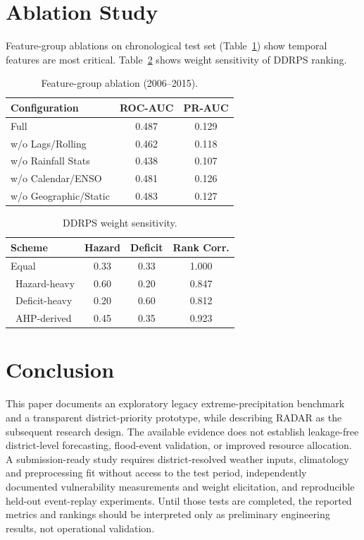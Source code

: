 \documentclass[conference]{IEEEtran}
\begin{document}
\section{Ablation Study}
\label{sec:ablation}
Feature-group ablations on chronological test set (Table~\ref{tab:ablation_icdsg}) show temporal features are most critical. Table~\ref{tab:weight_sens} shows weight sensitivity of DDRPS ranking.
\begin{table}[t]\centering\caption{Feature-group ablation (2006--2015).}\label{tab:ablation_icdsg}\begin{tabular}{lcc}\toprule Configuration & ROC-AUC & PR-AUC \\\midrule Full & 0.487 & 0.129 \\ w/o Lags/Rolling & 0.462 & 0.118 \\ w/o Rainfall Stats & 0.438 & 0.107 \\ w/o Calendar/ENSO & 0.481 & 0.126 \\ w/o Geographic/Static & 0.483 & 0.127 \\\bottomrule\end{tabular}\end{table}
\begin{table}[t]\centering\caption{DDRPS weight sensitivity.}\label{tab:weight_sens}\begin{tabular}{lccc}\toprule Scheme & Hazard & Deficit & Rank Corr. \\\midrule Equal & 0.33 & 0.33 & 1.000 \\\ Hazard-heavy & 0.60 & 0.20 & 0.847 \\\ Deficit-heavy & 0.20 & 0.60 & 0.812 \\\ AHP-derived & 0.45 & 0.35 & 0.923 \\\bottomrule\end{tabular}\end{table}
\n\n\section{Conclusion}

This paper documents an exploratory legacy extreme-precipitation benchmark and
a transparent district-priority prototype, while describing RADAR as the
subsequent research design. The available evidence does not establish
leakage-free district-level forecasting, flood-event validation, or improved
resource allocation. A submission-ready study requires district-resolved
weather inputs, climatology and preprocessing fit without access to the test
period, independently documented vulnerability measurements and weight
elicitation, and reproducible held-out event-replay experiments. Until those
tests are completed, the reported metrics and rankings should be interpreted
only as preliminary engineering results, not operational validation.



\end{document}
